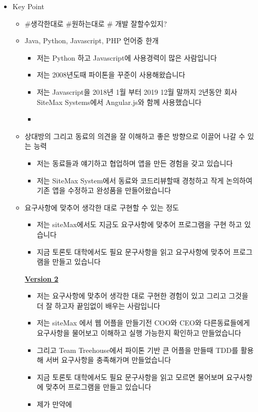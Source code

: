 \documentclass[12pt]{article}
\begin{document}
\begin{itemize}
    \item Key Point
    \begin{itemize}
        \item \#생각한대로 \#원하는대로 \# 개발 잘할수있지?
        \item Java, Python, Javascript, PHP 언어중 한개
        \begin{itemize}
            \item 저는 Python 하고 Javascript에 사용경력이 많은 사람입니다
            \item 저는 2008년도때 파이톤을 꾸준이 사용해왔습니다
            \item 저는 Javascript을 2018년 1월 부터 2019 12월 말까지 2년동안 회사 SiteMax Systems에서 Angular.js와 함께 사용했습니다
            \item
        \end{itemize}
        \item 상대방의 그리고 동료의 의견을 잘 이해하고 좋은 방향으로 이끌어 나갈 수 있는 능력
        \begin{itemize}
            \item 저는 동료들과 얘기하고 협업하며 앱을 만든 경험을 갖고 있습니다
            \item 저는 SiteMax System에서 동료와 코드리뷰할때 경청하고 작게 논의하여 기존 앱을 수정하고 완성품을 만들어왔습니다
        \end{itemize}
        \item 요구사항에 맞추어 생각한 대로 구현할 수 있는 정도
        \begin{itemize}
            \item 저는 siteMax에서도 지금도 요구사항에 맞추어 프로그램을 구현 하고 있습니다
            \item 지금 토론토 대학에서도 필요 문구사항을 읽고 요구사항에 맞추어 프로그램을 만들고 있습니다
        \end{itemize}

        \bigskip

        \underline{\textbf{Version 2}}

        \bigskip

        \begin{itemize}
            \item 저는 요구사항에 맞추어 생각한 대로 구현한 경험이 있고 그리고 그것을 더 잘 하고자 끝임없이 배우는 사람입니다
            \item 저는 siteMax 에서 웹 어플을 만들기전 COO와 CEO와 다른동료들에게 요구사항을 물어보고 이해하고 실행 가능한지 확인하고 만들었습니다
            \item 그리고 Team Treehouse에서 파이톤 기반 큰 어플을 만들때 TDD를 활용해 서버 요구사항을 충족해가며 만들었습니다
            \item 지금 토론토 대학에서도 필요 문구사항을 읽고 모르면 물어보며 요구사항에 맞추어 프로그램을 만들고 있습니다
            \item 제가 만약에
        \end{itemize}


\end{itemize}
\end{itemize}
\end{document}
